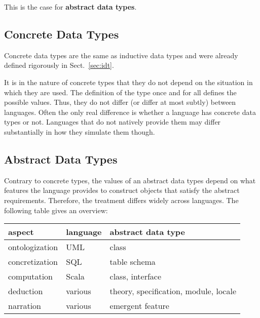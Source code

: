 This is the case for \textbf{abstract data types}.

\subsection{Concrete Data Types}

Concrete data types are the same as inductive data types and were already defined rigorously in Sect.~\ref{sec:idt}.

It is in the nature of concrete types that they do not depend on the situation in which they are used.
The definition of the type once and for all defines the possible values.
Thus, they do not differ (or differ at most subtly) between languages.
Often the only real difference is whether a language has concrete data types or not.
Languages that do not natively provide them may differ substantially in how they simulate them though.

\subsection{Abstract Data Types}

Contrary to concrete types, the values of an abstract data types depend on what features the language provides to construct objects that satisfy the abstract requirements.
Therefore, the treatment differs widely across languages.
The following table gives an overview:

\begin{center}
\begin{tabular}{l|ll}
aspect & language & abstract data type \\
\hline
ontologization & UML & class \\
concretization & SQL & table schema \\
computation & Scala & class, interface \\
deduction & various & theory, specification, module, locale \\
narration & various & emergent feature
\end{tabular}
\end{center}

